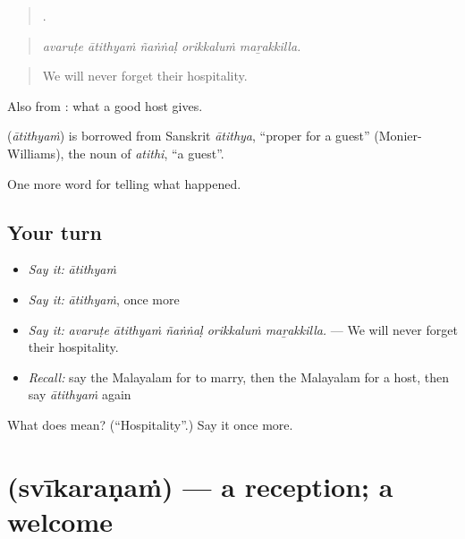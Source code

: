\begin{quote}
    .
\end{quote}

\begin{quote}
\emph{avaruṭe ātithyaṁ ñaṅṅaḷ orikkaluṁ maṟakkilla.}
\end{quote}

\begin{quote}
We will never forget their hospitality.
\end{quote}

Also from : what a good host gives.

\begin{cousinweb}
\textbf{} (\emph{ātithyaṁ}) is borrowed from Sanskrit \emph{ātithya}, \textquotedblleft{}proper for a guest\textquotedblright{} (Monier-Williams), the noun of \emph{atithi}, \textquotedblleft{}a guest\textquotedblright{}.
\end{cousinweb}

\begin{grammarlens}[title={What you've built}]
One more word for telling what happened.
\end{grammarlens}

\subsection*{Your turn}
\begin{itemize}
\raggedright
  \item \emph{Say it:} \emph{ātithyaṁ}
  \item \emph{Say it:} \emph{ātithyaṁ}, once more
  \item \emph{Say it:} \emph{avaruṭe ātithyaṁ ñaṅṅaḷ orikkaluṁ maṟakkilla.} — We will never forget their hospitality.
  \item \emph{Recall:} say the Malayalam for to marry, then the Malayalam for a host, then say \emph{ātithyaṁ} again
\end{itemize}

\begin{tcolorbox}[breakable,colback=teal!4,colframe=teal!35!black,title={Before you move on}]
What does  mean? (\textquotedblleft{}Hospitality\textquotedblright{}.) Say it once more.
\end{tcolorbox}
\section[\texorpdfstring{\ml{സ്വീകരണം} (svīkaraṇaṁ)}{സ്വീകരണം (svīkaraṇaṁ)}]{ (svīkaraṇaṁ) — a reception; a welcome}

